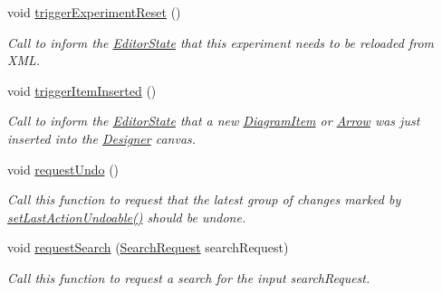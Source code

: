 \begin{DoxyCompactItemize}
void \hyperlink{class_editor_state_a171f60df7de30e116e02eae6e8653143}{trigger\-Experiment\-Reset} ()
\begin{DoxyCompactList}\small\item\em Call to inform the \hyperlink{class_editor_state}{Editor\-State} that this experiment needs to be reloaded from X\-M\-L. \end{DoxyCompactList}\item 
\hypertarget{class_editor_state_a57f20d1fdc749babb13531095445f604}{void \hyperlink{class_editor_state_a57f20d1fdc749babb13531095445f604}{trigger\-Item\-Inserted} ()}\label{class_editor_state_a57f20d1fdc749babb13531095445f604}

\begin{DoxyCompactList}\small\item\em Call to inform the \hyperlink{class_editor_state}{Editor\-State} that a new \hyperlink{class_diagram_item}{Diagram\-Item} or \hyperlink{class_arrow}{Arrow} was just inserted into the \hyperlink{class_designer}{Designer} canvas. \end{DoxyCompactList}\item 
\hypertarget{class_editor_state_ad83e491bc6df371b434096c36234eb6a}{void \hyperlink{class_editor_state_ad83e491bc6df371b434096c36234eb6a}{request\-Undo} ()}\label{class_editor_state_ad83e491bc6df371b434096c36234eb6a}

\begin{DoxyCompactList}\small\item\em Call this function to request that the latest group of changes marked by \hyperlink{class_editor_state_a14a1806929ce9f6fc1c48a5dc356da4f}{set\-Last\-Action\-Undoable()} should be undone. \end{DoxyCompactList}\item 
void \hyperlink{class_editor_state_a8f26f76de1118e7e16dc6bd82496078a}{request\-Search} (\hyperlink{struct_search_request}{Search\-Request} search\-Request)
\begin{DoxyCompactList}\small\item\em Call this function to request a search for the input search\-Request. \end{DoxyCompactList}\end{DoxyCompactItemize}
